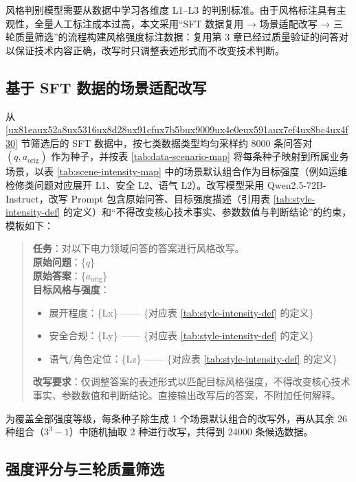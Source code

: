 \documentclass[fontset=fandol,type=master,campus=shenzhen,etitleauto=true]{hithesisbook}
\begin{document}
风格判别模型需要从数据中学习各维度 L1--L3 的判别标准。由于风格标注具有主观性，全量人工标注成本过高，本文采用“SFT 数据复用 → 场景适配改写 → 三轮质量筛选”的流程构建风格强度标注数据：复用第 3 章已经过质量验证的问答对以保证技术内容正确，改写时只调整表述形式而不改变技术判断。

\subsection{基于 SFT 数据的场景适配改写}\label{ux57faux4e8e-sft-ux6570ux636eux7684ux573aux666fux9002ux914dux6539ux5199}

从 \ref{ux81eaux52a8ux5316ux8d28ux91cfux7b5bux9009ux4e0eux591aux7ef4ux8bc4ux4f30} 节筛选后的 SFT 数据中，按七类数据类型均匀采样约 8000 条问答对 $(q, a_{\text{orig}})$ 作为种子，并按表 \ref{tab:data-scenario-map} 将每条种子映射到所属业务场景，以表 \ref{tab:scene-intensity-map} 中的场景默认组合作为目标强度（例如运维检修类问题对应展开 L1、安全 L2、语气 L2）。改写模型采用 Qwen2.5-72B-Instruct，改写 Prompt 包含原始问答、目标强度描述（引用表 \ref{tab:style-intensity-def} 的定义）和“不得改变核心技术事实、参数数值与判断结论”的约束，模板如下：

\begin{quote}
\small
\textbf{任务}：对以下电力领域问答的答案进行风格改写。\\
\textbf{原始问题}：\{$q$\}\\
\textbf{原始答案}：\{$a_{\text{orig}}$\}\\
\textbf{目标风格与强度}：
\begin{itemize}
\item 展开程度：\{Lx\} —— \{对应表 \ref{tab:style-intensity-def} 的定义\}
\item 安全合规：\{Ly\} —— \{对应表 \ref{tab:style-intensity-def} 的定义\}
\item 语气/角色定位：\{Lz\} —— \{对应表 \ref{tab:style-intensity-def} 的定义\}
\end{itemize}
\textbf{改写要求}：仅调整答案的表述形式以匹配目标风格强度，不得改变核心技术事实、参数数值和判断结论。直接输出改写后的答案，不附加任何解释。
\end{quote}

为覆盖全部强度等级，每条种子除生成 1 个场景默认组合的改写外，再从其余 26 种组合（$3^3 - 1$）中随机抽取 2 种进行改写，共得到 24000 条候选数据。

\subsection{强度评分与三轮质量筛选}\label{ux4e09ux8f6eux8d28ux91cfux7b5bux9009}
\end{document}
